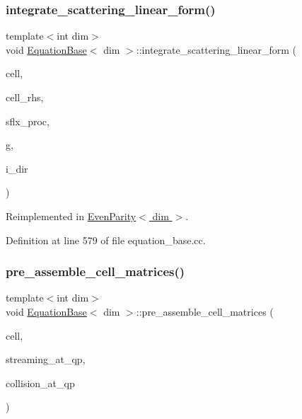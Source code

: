 \subsubsection{\texorpdfstring{integrate\+\_\+scattering\+\_\+linear\+\_\+form()}{integrate\_scattering\_linear\_form()}}
{\footnotesize\ttfamily template$<$int dim$>$ \\
void \hyperlink{class_equation_base}{Equation\+Base}$<$ dim $>$\+::integrate\+\_\+scattering\+\_\+linear\+\_\+form (\begin{DoxyParamCaption}\item[{typename Do\+F\+Handler$<$ dim $>$\+::active\+\_\+cell\+\_\+iterator \&}]{cell,  }\item[{Vector$<$ double $>$ \&}]{cell\+\_\+rhs,  }\item[{std\+::vector$<$ Vector$<$ double $>$ $>$ \&}]{sflx\+\_\+proc,  }\item[{const unsigned int \&}]{g,  }\item[{const unsigned int \&}]{i\+\_\+dir }\end{DoxyParamCaption})\hspace{0.3cm}{\ttfamily [virtual]}}



Reimplemented in \hyperlink{class_even_parity_a595082361e618c077877f92d04ebab0b}{Even\+Parity$<$ dim $>$}.



Definition at line 579 of file equation\+\_\+base.\+cc.

\mbox{\label{class_equation_base_a39f0465a523e038302f624f89c08a2ee}} 
\subsubsection{\texorpdfstring{pre\+\_\+assemble\+\_\+cell\+\_\+matrices()}{pre\_assemble\_cell\_matrices()}}
{\footnotesize\ttfamily template$<$int dim$>$ \\
void \hyperlink{class_equation_base}{Equation\+Base}$<$ dim $>$\+::pre\+\_\+assemble\+\_\+cell\+\_\+matrices (\begin{DoxyParamCaption}\item[{typename Do\+F\+Handler$<$ dim $>$\+::active\+\_\+cell\+\_\+iterator \&}]{cell,  }\item[{std\+::vector$<$ std\+::vector$<$ Full\+Matrix$<$ double $>$ $>$ $>$ \&}]{streaming\+\_\+at\+\_\+qp,  }\item[{std\+::vector$<$ Full\+Matrix$<$ double $>$ $>$ \&}]{collision\+\_\+at\+\_\+qp }\end{DoxyParamCaption})\hspace{0.3cm}{\ttfamily [virtual]}}




